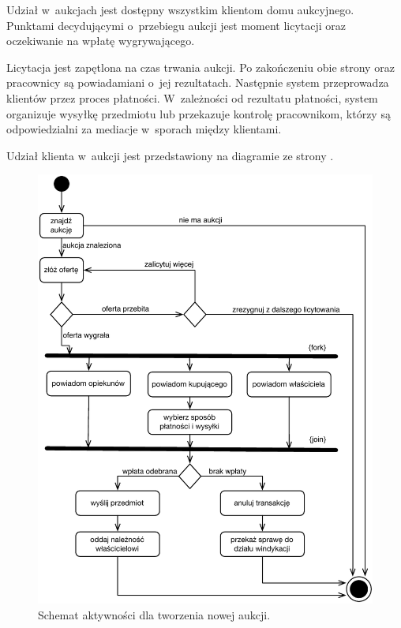 \documentclass[10pt,a4paper]{article}
\begin{document}
Udział w~aukcjach jest dostępny wszystkim klientom domu aukcyjnego. Punktami
decydującymi o~przebiegu aukcji jest moment licytacji oraz oczekiwanie na
wpłatę wygrywającego.

Licytacja jest zapętlona na czas trwania aukcji. Po zakończeniu obie strony
oraz pracownicy są powiadamiani o~jej rezultatach. Następnie system
przeprowadza klientów przez proces płatności. W~zależności od rezultatu
płatności, system organizuje wysyłkę przedmiotu lub przekazuje kontrolę
pracownikom, którzy są odpowiedzialni za mediacje w~sporach między klientami.

Udział klienta w~aukcji jest przedstawiony na diagramie
ze strony \pageref{fig:aktywnosc_udzial_w_aukcji}.

\newpage
\begin{figure}[p]
  \begin{adjustwidth}{-3cm}{-3cm}
    \centering
    \includegraphics{figury/aktywnosc-udzial-w-aukcji}
    \caption{Schemat aktywności dla tworzenia nowej aukcji.}
    \label{fig:aktywnosc_udzial_w_aukcji}
  \end{adjustwidth}
\end{figure}
\clearpage
\end{document}
